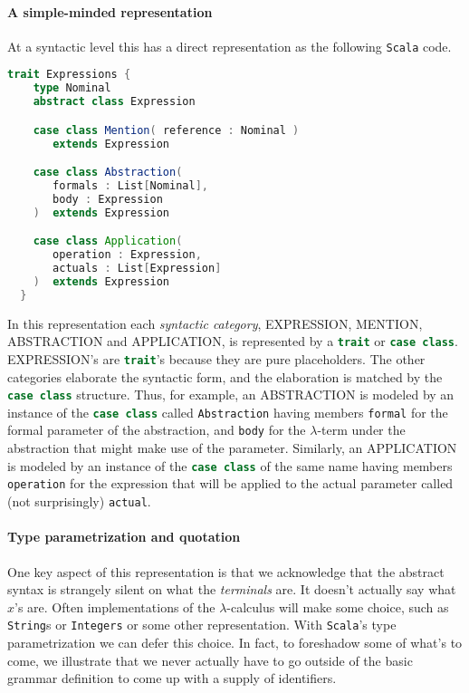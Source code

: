 \paragraph{A simple-minded representation}
At a syntactic level this has a direct representation as the following
\texttt{Scala} code.

\begin{lstlisting}[language=Scala]
  trait Expressions {
    type Nominal    
    abstract class Expression

    case class Mention( reference : Nominal )
       extends Expression

    case class Abstraction(
       formals : List[Nominal],
       body : Expression
    )  extends Expression

    case class Application(
       operation : Expression,
       actuals : List[Expression]
    )  extends Expression        
  }
\end{lstlisting}

In this representation each \emph{syntactic category}, EXPRESSION, MENTION,
ABSTRACTION and APPLICATION, is represented by a
\lstinline[language=Scala]!trait! or \lstinline[language=Scala]!case class!.
EXPRESSION's are \lstinline[language=Scala]!trait!'s because they
are pure placeholders. The other categories elaborate the syntactic
form, and the elaboration is matched by the
\lstinline[language=Scala]!case class!  structure. Thus, for example,
an ABSTRACTION is modeled by an instance of the
\lstinline[language=Scala]!case class! called
\lstinline[language=Scala]!Abstraction! having members
\lstinline[language=Scala]!formal! for the formal parameter of the
abstraction, and \lstinline[language=Scala]!body! for the
$\lambda$-term under the abstraction that might make use of the
parameter. Similarly, an APPLICATION is modeled by an instance of the
\lstinline[language=Scala]!case class! of the same name having members
\lstinline[language=Scala]!operation! for the expression that will be applied
to the actual parameter called (not surprisingly)
\lstinline[language=Scala]!actual!.

\paragraph{Type parametrization and quotation}
One key aspect of this representation is that we acknowledge that the
abstract syntax is strangely silent on what the \emph{terminals}
are. It doesn't actually say what $x$'s are. Often implementations of
the $\lambda$-calculus will make some choice, such as
\lstinline[language=Scala]!String!s or
\lstinline[language=Scala]!Integers! or some other
representation. With \texttt{Scala}'s type parametrization we can
defer this choice. In fact, to foreshadow some of what's to come, we
illustrate that we never actually have to go outside of the basic
grammar definition to come up with a supply of identifiers.

